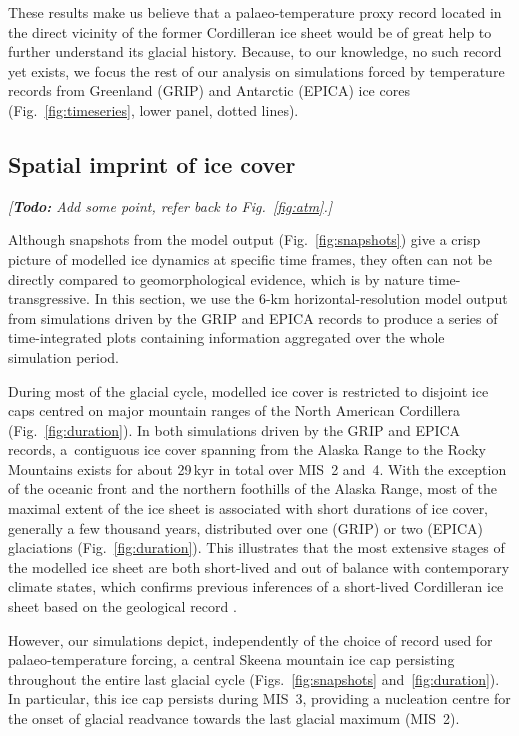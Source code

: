 \documentclass[tc, manuscript]{copernicus}
\newcommand{\todo}[1]{\emph{[\textbf{Todo:} #1]}}
\begin{document}
These results make us believe that a palaeo-temperature proxy record located
in the direct vicinity of the former Cordilleran ice sheet would be of great
help to further understand its glacial history. Because, to our knowledge, no
such record yet exists, we focus the rest of our analysis on simulations forced
by temperature records from Greenland (GRIP) and Antarctic (EPICA) ice cores
(Fig.~\ref{fig:timeseries}, lower panel, dotted lines).

\subsection{Spatial imprint of ice cover}

\todo{Add some point, refer back to Fig.~\ref{fig:atm}.}

Although snapshots from the model output (Fig.~\ref{fig:snapshots}) give a
crisp picture of modelled ice dynamics at specific time frames, they often
can not be directly compared to geomorphological evidence, which is by nature
time-transgressive. In this section, we use the 6-km horizontal-resolution
model output from simulations driven by the GRIP and EPICA records to produce
a series of time-integrated plots containing information aggregated over the
whole simulation period.

During most of the glacial cycle, modelled ice cover is restricted to disjoint
ice caps centred on major mountain ranges of the North American Cordillera
(Fig.~\ref{fig:duration}). In both simulations driven by the GRIP and EPICA
records, a~contiguous ice cover spanning from the Alaska Range to the Rocky
Mountains exists for about 29\,kyr in total over MIS~2 and~4.
With the exception of the oceanic front and the northern foothills of the Alaska
Range, most of the maximal extent of the ice sheet is associated with short
durations of ice cover, generally a few thousand years, distributed over one
(GRIP) or two (EPICA) glaciations (Fig.~\ref{fig:duration}). This illustrates
that the most extensive stages of the modelled ice sheet are both short-lived
and out of balance with contemporary climate states, which confirms previous
inferences of a short-lived Cordilleran ice sheet based on the geological
record \citep{Clague.etal.1980, Stroeven.etal.2010}.

However, our simulations depict, independently of the choice of record used for
palaeo-temperature forcing, a central Skeena mountain ice cap persisting
throughout the entire last glacial cycle (Figs.~\ref{fig:snapshots}
and~\ref{fig:duration}). In particular, this ice cap persists during MIS~3,
providing a nucleation centre for the onset of glacial
readvance towards the last glacial maximum (MIS~2).
\end{document}
